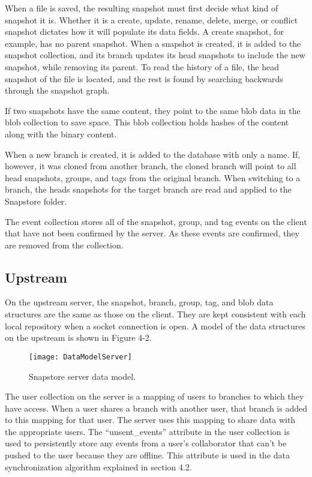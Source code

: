 When a file is saved, the resulting snapshot must first decide what kind of snapshot it is. Whether it is a create, update, rename, delete, merge, or conflict snapshot dictates how it will populate its data fields. A create snapshot, for example, has no parent snapshot. When a snapshot is created, it is added to the snapshot collection, and its branch updates its head snapshots to include the new snapshot, while removing its parent. To read the history of a file, the head snapshot of the file is located, and the rest is found by searching backwards through the snapshot graph.

If two snapshots have the same content, they point to the same blob data in the blob collection to save space. This blob collection holds hashes of the content along with the binary content.

When a new branch is created, it is added to the database with only a name. If, however, it was cloned from another branch, the cloned branch will point to all head snapshots, groups, and tags from the original branch. When switching to a branch, the heads snapshots for the target branch are read and applied to the Snapstore folder.

The event collection stores all of the snapshot, group, and tag events on the client that have not been confirmed by the server. As these events are confirmed, they are removed from the collection.

\subsection{Upstream}

On the upstream server, the snapshot, branch, group, tag, and blob data structures are the same as those on the client. They are kept consistent with each local repository when a socket connection is open. A model of the data structures on the upstream is shown in Figure 4-2.

\begin{figure}
\texttt{[image: DataModelServer]}
\caption{Snapstore server data model.}
\label{arm:fig1}
\end{figure}

The user collection on the server is a mapping of users to branches to which they have access. When a user shares a branch with another user, that branch is added to this mapping for that user. The server uses this mapping to share data with the appropriate users. The ``unsent\_events'' attribute in the user collection is used to persistently store any events from a user's collaborator that can't be pushed to the user because they are offline. This attribute is used in the data synchronization algorithm explained in section 4.2.

